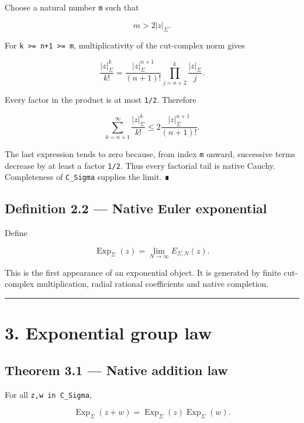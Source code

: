 Choose a natural number \texttt{m} such that

\[
m>2|z|_\Sigma.
\]

For \texttt{k\ \textgreater{}=\ n+1\ \textgreater{}=\ m}, multiplicativity of the cut-complex norm gives

\[
\frac{|z|_\Sigma^k}{k!}
=
\frac{|z|_\Sigma^{n+1}}{(n+1)!}
\prod_{j=n+2}^{k}\frac{|z|_\Sigma}{j}.
\]

Every factor in the product is at most \texttt{1/2}. Therefore

\[
\sum_{k=n+1}^{\infty}\frac{|z|_\Sigma^k}{k!}
\le
2\frac{|z|_\Sigma^{n+1}}{(n+1)!}.
\]

The last expression tends to zero because, from index \texttt{m} onward, successive
terms decrease by at least a factor \texttt{1/2}. Thus every factorial tail is native
Cauchy. Completeness of \texttt{C\_Sigma} supplies the limit. ∎

\hypertarget{definition-2.2-native-euler-exponential}{%
\subsection{Definition 2.2 --- Native Euler exponential}\label{definition-2.2-native-euler-exponential}}

Define

\[
\boxed{
\operatorname{Exp}_\Sigma(z)
=
\lim_{N\to\infty}E_{\Sigma,N}(z).
}
\]

This is the first appearance of an exponential object. It is generated by
finite cut-complex multiplication, radial rational coefficients and native
completion.

\begin{center}\rule{0.5\linewidth}{0.5pt}\end{center}

\hypertarget{exponential-group-law}{%
\section{3. Exponential group law}\label{exponential-group-law}}

\hypertarget{theorem-3.1-native-addition-law}{%
\subsection{Theorem 3.1 --- Native addition law}\label{theorem-3.1-native-addition-law}}

For all \texttt{z,w\ in\ C\_Sigma},

\[
\boxed{
\operatorname{Exp}_\Sigma(z+w)
=
\operatorname{Exp}_\Sigma(z)
\operatorname{Exp}_\Sigma(w).
}
\]

